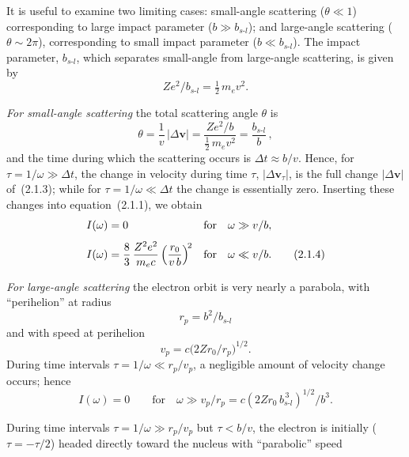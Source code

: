 It is useful to examine two limiting cases: small-angle scattering ($\theta \ll 1$)
corresponding to large impact parameter ($b \gg b_{s\text{-}l}$); and large-angle scattering
($\theta \sim 2\pi$), corresponding to small impact parameter ($b \ll b_{s\text{-}l}$). The impact
parameter, $b_{s\text{-}l}$, which separates small-angle from large-angle scattering, is given
by
%
\begin{equation}
Ze^2 / b_{s\text{-}l} = \tfrac{1}{2}\, m_e v^2.
\tag{2.1.2}
\end{equation}

\textit{For small-angle scattering} the total scattering angle $\theta$ is
%
\begin{equation}
\theta = \frac{1}{v}\, |\Delta \mathbf{v}|
      = \frac{Ze^2/b}{\frac{1}{2}\, m_e v^2}
      = \frac{b_{s\text{-}l}}{b}\,,
\tag{2.1.3}
\end{equation}
%
and the time during which the scattering occurs is $\Delta t \approx b/v$.  Hence, for
$\tau = 1/\omega \gg \Delta t$, the change in velocity during time $\tau$, $|\Delta \mathbf{v}_\tau|$,
is the full change $|\Delta \mathbf{v}|$ of~(2.1.3); while for $\tau = 1/\omega \ll \Delta t$ the change is
essentially zero.  Inserting these changes into equation~(2.1.1), we obtain
%
\begin{align}
I(\omega) &= 0  &\text{for}&\quad \omega \gg v/b, \notag \\[4pt]
I(\omega) &= \frac{8}{3}\,\frac{Z^2 e^2}{m_e c}\left(\frac{r_0}{v\,b}\right)^{\!2}
           &\text{for}&\quad \omega \ll v/b.
\tag{2.1.4}
\end{align}

\textit{For large-angle scattering} the electron orbit is very nearly a parabola, with
``perihelion'' at radius
%
\begin{equation}
r_p = b^2 / b_{s\text{-}l}
\tag{2.1.5a}
\end{equation}
%
and with speed at perihelion
%
\begin{equation}
v_p = c\bigl(2 Z r_0 / r_p\bigr)^{1/2}.
\tag{2.1.5b}
\end{equation}
%
During time intervals $\tau = 1/\omega \ll r_p/v_p$, a negligible amount of velocity change
occurs; hence
%
\begin{equation}
I(\omega) = 0 \qquad \text{for}\quad \omega \gg v_p/r_p
           = c(2Zr_0\, b_{s\text{-}l}^{\,3})^{1/2}/b^3.
\tag{2.1.6a}
\end{equation}

During time intervals $\tau = 1/\omega \gg r_p/v_p$ but $\tau < b/v$, the electron is initially
($\tau = -\tau/2$) headed directly toward the nucleus with ``parabolic'' speed

